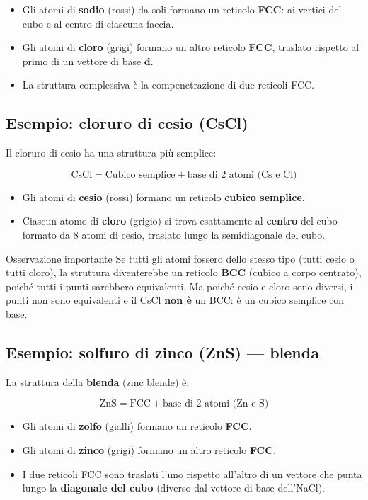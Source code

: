 \begin{itemize}
    \item Gli atomi di \textbf{sodio} (rossi) da soli formano un reticolo \textbf{FCC}: ai vertici del cubo e al centro di ciascuna faccia.
    \item Gli atomi di \textbf{cloro} (grigi) formano un altro reticolo \textbf{FCC}, traslato rispetto al primo di un vettore di base $\mathbf{d}$.
    \item La struttura complessiva è la compenetrazione di due reticoli FCC.
\end{itemize}

\subsection*{Esempio: cloruro di cesio (CsCl)}

Il cloruro di cesio ha una struttura più semplice:

$$\text{CsCl} = \text{Cubico semplice} + \text{base di 2 atomi (Cs e Cl)}$$

\begin{itemize}
    \item Gli atomi di \textbf{cesio} (rossi) formano un reticolo \textbf{cubico semplice}.
    \item Ciascun atomo di \textbf{cloro} (grigio) si trova esattamente al \textbf{centro} del cubo formato da 8 atomi di cesio, traslato lungo la semidiagonale del cubo.
\end{itemize}

\begin{definizione}{Osservazione importante}
Se tutti gli atomi fossero dello stesso tipo (tutti cesio o tutti cloro), la struttura diventerebbe un reticolo \textbf{BCC} (cubico a corpo centrato), poiché tutti i punti sarebbero equivalenti. Ma poiché cesio e cloro sono diversi, i punti non sono equivalenti e il CsCl \textbf{non è} un BCC: è un cubico semplice con base.
\end{definizione}

\subsection*{Esempio: solfuro di zinco (ZnS) — blenda}

La struttura della \textbf{blenda} (zinc blende) è:

$$\text{ZnS} = \text{FCC} + \text{base di 2 atomi (Zn e S)}$$

\begin{itemize}
    \item Gli atomi di \textbf{zolfo} (gialli) formano un reticolo \textbf{FCC}.
    \item Gli atomi di \textbf{zinco} (grigi) formano un altro reticolo \textbf{FCC}.
    \item I due reticoli FCC sono traslati l'uno rispetto all'altro di un vettore che punta lungo la \textbf{diagonale del cubo} (diverso dal vettore di base dell'NaCl).
\end{itemize}

